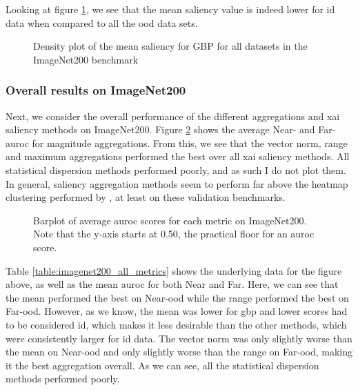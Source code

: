 \documentclass[UKenglish]{uiomasterthesis} %
\theoremstyle{definition}
\begin{document}
Looking at figure \ref{fig:imagenet200_gbp_mean_full}, we see that the mean saliency value is indeed lower for \ac{id} data when compared to all the \ac{ood} data sets.

\begin{figure}[H]
    \begin{center}
        
    \end{center}
    \caption[Density plot of mean saliency for GBP on ImageNet200]{Density plot of the mean saliency for GBP for all datasets in the ImageNet200 benchmark}
    \label{fig:imagenet200_gbp_mean_full}
\end{figure}

\subsubsection{Overall results on ImageNet200}

Next, we consider the overall performance of the different aggregations and \ac{xai} saliency methods on ImageNet200. Figure \ref{fig:imagenet200_all_metrics_barplot} shows the average Near- and Far-\ac{auroc} for magnitude aggregations. From this, we see that the vector norm, range and maximum aggregations performed the best over all \ac{xai} saliency methods. All statistical dispersion methods performed poorly, and as such I do not plot them. In general, saliency aggregation methods seem to perform far above the heatmap clustering performed by \cite{martinez}, at least on these validation benchmarks.

\begin{figure}[H]
    \begin{center}
        
    \end{center}
    \caption[Average AUROC scores for magnitude aggregations on ImageNet200]{Barplot of average \ac{auroc} scores for each metric on ImageNet200. Note that the y-axis starts at 0.50, the practical floor for an \ac{auroc} score.}
    \label{fig:imagenet200_all_metrics_barplot}
\end{figure}


Table \ref{table:imagenet200_all_metrics} shows the underlying data for the figure above, as well as the mean \ac{auroc} for both Near and Far. Here, we can see that the mean performed the best on Near-\ac{ood} while the range performed the best on Far-\ac{ood}. However, as we know, the mean was lower for \ac{gbp} and lower scores had to be considered \ac{id}, which makes it less desirable than the other methods, which were consistently larger for \ac{id} data. The vector norm was only slightly worse than the mean on Near-\ac{ood} and only slightly worse than the range on Far-\ac{ood}, making it the best aggregation overall. As we can see, all the statistical dispersion methods performed poorly.
\end{document}
